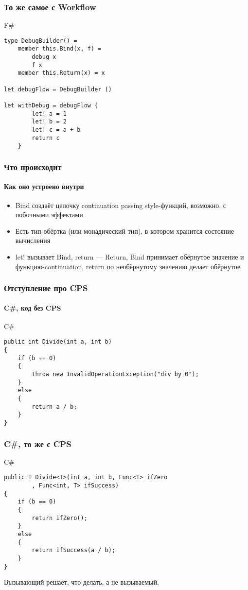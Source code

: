 \documentclass[xetex,mathserif,serif]{beamer}
\begin{document}
	\begin{frame}[fragile]
		\frametitle{То же самое с Workflow}
   		\begin{exampleblock}{F\#}
   			\begin{lstlisting}
type DebugBuilder() =
    member this.Bind(x, f) = 
        debug x 
        f x
    member this.Return(x) = x

let debugFlow = DebugBuilder ()

let withDebug = debugFlow {
        let! a = 1
        let! b = 2
        let! c = a + b
        return c
    }
\end{lstlisting}
\end{exampleblock}
\end{frame}

	\begin{frame}
		\frametitle{Что происходит}
		\framesubtitle{Как оно устроено внутри}
		\begin{itemize}
    		\item Bind создаёт цепочку continuation passing style-функций, возможно, с побочными эффектами
    		\item Есть тип-обёртка (или монадический тип), в котором хранится состояние вычисления
    		\item let! вызывает Bind, return --- Return, Bind принимает обёрнутое значение и функцию-continuation, return по необёрнутому значению делает обёрнутое
		\end{itemize}
    \end{frame}

	\begin{frame}[fragile]
		\frametitle{Отступление про CPS}
		\framesubtitle{C\#, код без CPS}
   		\begin{exampleblock}{C\#}
   			\begin{lstlisting}
public int Divide(int a, int b)
{
    if (b == 0)
    {
        throw new InvalidOperationException("div by 0");
    }
    else
    {
        return a / b;
    }
}
\end{lstlisting}
\end{exampleblock}
\end{frame}

	\begin{frame}[fragile]
		\frametitle{C\#, то же с CPS}
   		\begin{exampleblock}{C\#}
   			\begin{lstlisting}
public T Divide<T>(int a, int b, Func<T> ifZero
        , Func<int, T> ifSuccess)
{
    if (b == 0)
    {
        return ifZero();
    }
    else
    {
        return ifSuccess(a / b);
    }
}
\end{lstlisting}
\end{exampleblock}
Вызывающий решает, что делать, а не вызываемый.
\end{frame}
\end{document}
